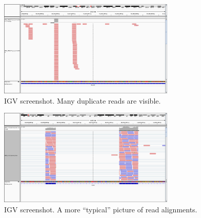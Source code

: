 \documentclass{article}
\begin{document}
\begin{figure}[ht!]
  \centering
    \includegraphics[width=0.75\textwidth]{igv_duplicates.png}
    \caption{IGV screenshot.  Many duplicate reads are visible.}
     \label{fig:igv_dups}
\end{figure}

\begin{figure}[ht!]
  \centering
    \includegraphics[width=0.75\textwidth]{igv_typical.png}
    \caption{IGV screenshot.  A more ``typical'' picture of read alignments.}
     \label{fig:igv_typical}
\end{figure}




\end{document}
